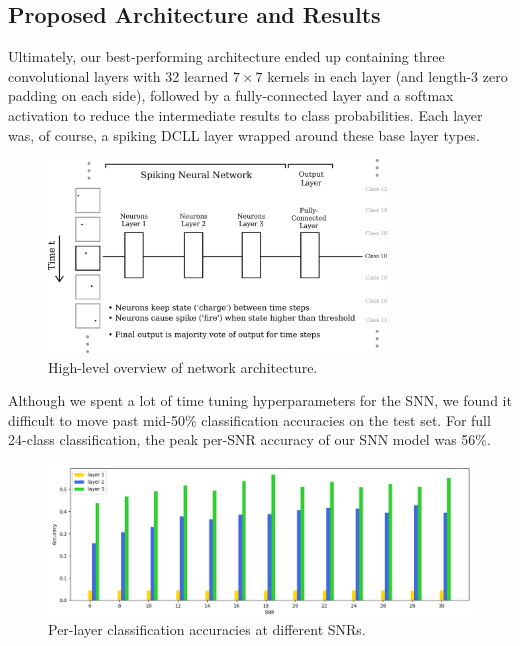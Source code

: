 \documentclass[parskip=true, 10pt]{scrartcl}
\begin{document}
\subsection{Proposed Architecture and Results}

Ultimately, our best-performing architecture ended up containing three convolutional layers with 32 learned $7 \times 7$ kernels in each layer (and length-3 zero padding on each side), followed by a fully-connected layer and a softmax activation to reduce the intermediate results to class probabilities. Each layer was, of course, a spiking DCLL layer wrapped around these base layer types.

\begin{figure}[H]
    \centering
    \includegraphics[width=0.8\textwidth]{network.png}
    \caption{High-level overview of network architecture.}
    \label{fig:network_arch}
\end{figure}

Although we spent a lot of time tuning hyperparameters for the SNN, we found it difficult to move past mid-50\% classification accuracies on the test set. For full 24-class classification, the peak per-SNR accuracy of our SNN model was 56\%.

\begin{figure}[H]
    \centering
    \includegraphics[width=\textwidth]{results_Jun12_06-28-21.png}
    \caption{Per-layer classification accuracies at different SNRs.}
    \label{fig:snr_results}
\end{figure}
\end{document}
